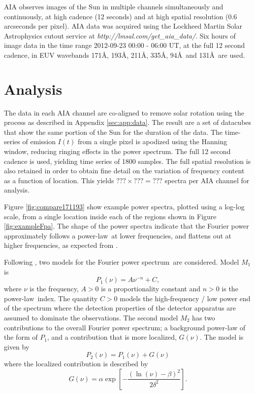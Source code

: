 \documentclass[onecolumn]{emulateapj}
\newcommand{\PS}{power spectrum}
\newcommand{\PL}{power-law}
\newcommand{\Fps}{Fourier \PS}
\newcommand{\allaiaeuv}{171\AA, 193\AA, 211\AA, 335\AA, 94\AA\ and 131\AA}
\newcommand{\BF}{ }
\begin{document}
{\BF AIA} observes images of the Sun in multiple channels
simultaneously and continuously, at high cadence (12 seconds) and at
high spatial resolution (0.6 arcseconds per pixel).  {\BF AIA} data
was acquired using the Lockheed Martin Solar Astrophysics cutout
service at {\it http://lmsal.com/get\_aia\_data/}.  Six hours of image
data in the time range 2012-09-23 00:00 - 06:00 UT, at the full 12
second cadence, in EUV wavebands \allaiaeuv\ are used.  


\section{Analysis}\label{sec:anal}
The data in each AIA channel are co-aligned to remove solar rotation
using the process as described in Appendix \ref{sec:app:data}.  The
result are a set of datacubes that show the same portion of the Sun
for the duration of the data.  The time-series of emission $I(t)$ from
a single pixel is apodized using the Hanning window, reducing ringing
effects in the \PS.  The full 12 second cadence is used, yielding time
series of 1800 samples.  The full spatial resolution is also retained
in order to obtain fine detail on the variation of frequency content
as a function of location.  This yields $???\times???=???$ spectra per
AIA channel for analysis.  

Figure \ref{fig:compare171193} show example power spectra, plotted
using a log-log scale, from a single location inside each of the
regions shown in Figure \ref{fig:exampleFpa}.  The shape of the power
spectra indicate that the Fourier power approximately follows a
\PL\ at lower frequencies, and flattens out at higher frequencies, as
expected from \citet{ireland2015}. 

Following \citet{ireland2015}, two models for the \Fps\ are
considered. Model $M_{1}$ is
\begin{equation}
\label{eqn:pwrlaw}
P_{1}(\nu) = A\nu^{-n} + C,
\end{equation}
where $\nu$ is the frequency, $A>0$ is a proportionality constant and
$n>0$ is the \PL\ index.  The quantity $C>0$ models the high-frequency
/ low power end of the spectrum where the detection properties of the
detector apparatus are assumed to dominate the observations. The
second model $M_{2}$ has two contributions to the overall \Fps; a
background power-law of the form of $P_{1}$, and a contribution that
is more localized, $G(\nu)$.  The model is given by
\begin{equation}
\label{eqn:pwrlawbump}
P_{2}(\nu) = P_{1}(\nu) + G(\nu)
\end{equation}
where the localized contribution is described by
\begin{equation}
\label{eqn:bump}
G(\nu) = \alpha\exp\left[-\frac{(\ln(\nu)-\beta)^{2}}{2\delta^{2}}\right].
\end{equation}
\end{document}
